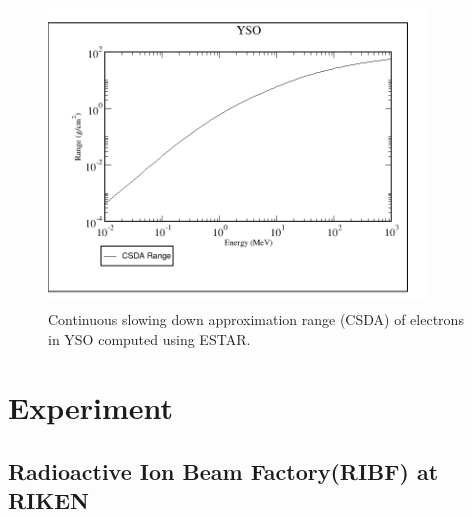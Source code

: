 \documentclass[a4paper,12pt,twoside]{report}
\begin{document}
\begin{figure}[h!]
    \centering
    \includegraphics[width=10cm,height=8cm]{yso_electrons_range.png}
    \caption[Continuous slowing down approximation range (CSDA)]{Continuous slowing down approximation range (CSDA) of electrons in YSO computed using ESTAR.}
    \label{fig:electron_range_yso}
\end{figure}


\newpage
\chapter{Experiment}
\section{Radioactive Ion Beam Factory(RIBF) at RIKEN}
\end{document}
